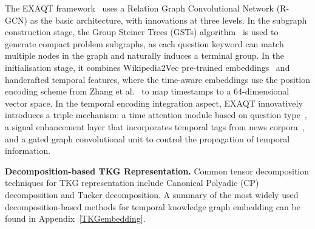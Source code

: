 {The EXAQT framework~\cite{jiaComplexTemporalQuestion2021} uses a Relation Graph Convolutional Network (R-GCN) as the basic architecture, with innovations at three levels. In the subgraph construction stage, the Group Steiner Trees (GSTs) algorithm~\cite{liEfficientProgressiveGroup2016} is used to generate compact problem subgraphs, as each question keyword can match multiple nodes in the graph and naturally induces a terminal group. In the initialisation stage, it combines Wikipedia2Vec pre-trained embeddings~\cite{yamadaWikipedia2VecEfficientToolkit2020} and handcrafted temporal features, where the time-aware embeddings use the position encoding scheme from Zhang et al.~\cite{zhangTemporalContextAwareRepresentation2020} to map timestamps to a 64-dimensional vector space. In the temporal encoding integration aspect, EXAQT innovatively introduces a triple mechanism: a time attention module based on question type~\cite{jiaTEQUILATemporalQuestion2018}, a signal enhancement layer that incorporates temporal tags from news corpora~\cite{setzerTemporalInformationNewswire2001}, and a gated graph convolutional unit to control the propagation of temporal information.

\textbf{Decomposition-based TKG Representation.}
Common tensor decomposition techniques for TKG representation include Canonical Polyadic (CP) decomposition and Tucker decomposition. A summary of the most widely used decomposition-based methods for temporal knowledge graph embedding can be found in Appendix~\ref{TKGembedding}.

}
